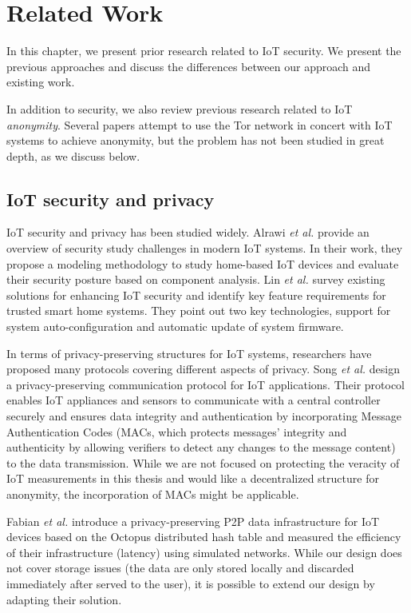 \chapter{Related Work}

In this chapter, we present prior research related to IoT security. We present the previous approaches and discuss the differences between our approach and existing work.

In addition to security, we also review previous research related to IoT \textit{anonymity}. Several papers attempt to use the Tor network in concert with IoT systems to achieve anonymity, but the problem has not been studied in great depth, as we discuss below. 

\section{IoT security and privacy}

IoT security and privacy has been studied widely. Alrawi \textit{et al.} \cite{alrawi2019sok} provide an overview of security study challenges in modern IoT systems. In their work, they propose a modeling methodology to study home-based IoT devices and evaluate their security posture based on component analysis. Lin \textit{et al.} \cite{lin2016iot} survey existing solutions for enhancing IoT security and identify key feature requirements for trusted smart home systems. They point out two key technologies, support for system auto-configuration and automatic update of system firmware. 


In terms of privacy-preserving structures for IoT systems, researchers have proposed many protocols covering different aspects of privacy. Song \textit{et al.} \cite{song2017privacy} design a privacy-preserving communication protocol for IoT applications. Their protocol enables IoT appliances and sensors to communicate with a central controller securely and ensures data integrity and authentication by incorporating Message Authentication Codes (MACs, which protects messages' integrity and authenticity by allowing verifiers to detect any changes to the message content) to the data transmission. While we are not focused on protecting the veracity of IoT measurements in this thesis and would like a decentralized structure for anonymity, the incorporation of MACs might be applicable.


Fabian \textit{et al.} \cite{fabian2014privacy} introduce a privacy-preserving P2P data infrastructure for IoT devices based on the Octopus distributed hash table \cite{wang2012octopus} and measured the efficiency of their infrastructure (latency) using simulated networks. While our design does not cover storage issues (the data are only stored locally and discarded immediately after served to the user), it is possible to extend our design by adapting their solution.

